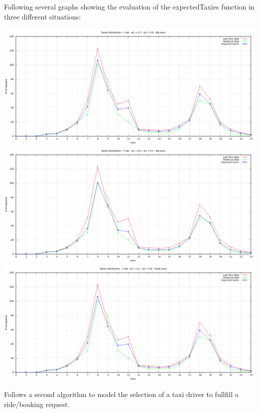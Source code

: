 \documentclass[11pt,titlepage]{article} %
\newenvironment{changemargin}[3]{%
\begin{list}{}{%
\setlength{\topsep}{0pt}%
\setlength{\headsep}{#3}%
\setlength{\leftmargin}{#1}%
\setlength{\rightmargin}{#2}%
\setlength{\listparindent}{\parindent}%
\setlength{\itemindent}{\parindent}%
\setlength{\parsep}{\parskip}%
}%
\item[]}{\end{list}}
\begin{document}
Following several graphs showing the evaluation of the expectedTaxies function in three different situations:\newline
\begin{changemargin}{-2cm}{0cm}{0cm}
	\includegraphics[scale=0.5]{graph1.png}
	\includegraphics[scale=0.5]{graph2.png}
	\includegraphics[scale=0.5]{graph3.png}
\end{changemargin}
\newpage
Follows a second algorithm to model the selection of a taxi driver to fullfill a ride/booking request.\newline
\end{document}

